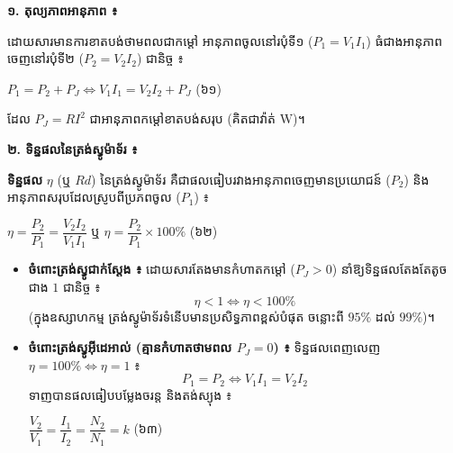 \vspace{0.5em}
\noindent
\textbf{១. តុល្យភាពអានុភាព ៖}

\noindent
ដោយសារមានការខាតបង់ថាមពលជាកម្ដៅ អានុភាពចូលនៅរបុំទី១ ($P_1 = V_1 I_1$) ធំជាងអានុភាពចេញនៅរបុំទី២ ($P_2 = V_2 I_2$) ជានិច្ច ៖
\begin{center}
    $\boxed{P_1 = P_2 + P_J} \iff \boxed{V_1 I_1 = V_2 I_2 + P_J}$ \quad (៦១)
\end{center}
ដែល $P_J = R I^2$ ជាអានុភាពកម្ដៅខាតបង់សរុប (គិតជាវ៉ាត់ $\text{W}$)។

\vspace{0.4em}
\noindent
\textbf{២. ទិន្នផលនៃត្រង់ស្វូម៉ាទ័រ ៖}

\noindent
\textbf{ទិន្នផល} $\eta$ (ឬ $Rd$) នៃត្រង់ស្វូម៉ាទ័រ គឺជាផលធៀបរវាងអានុភាពចេញមានប្រយោជន៍ ($P_2$) និងអានុភាពសរុបដែលស្រូបពីប្រភពចូល ($P_1$) ៖
\begin{center}
    $\boxed{\eta = \dfrac{P_2}{P_1} = \dfrac{V_2 I_2}{V_1 I_1}}$ \quad ឬ \quad $\boxed{\eta = \dfrac{P_2}{P_1} \times 100\%}$ \quad (៦២)
\end{center}

\begin{itemize}[itemsep=2.5pt, topsep=1.5pt, leftmargin=1.6em]
	\item \textbf{ចំពោះត្រង់ស្វូជាក់ស្ដែង ៖} ដោយសារតែងមានកំហាតកម្ដៅ ($P_J > 0$) នាំឱ្យទិន្នផលតែងតែតូចជាង $1$ ជានិច្ច ៖
    \[ \eta < 1 \iff \eta < 100\% \]
    (ក្នុងឧស្សាហកម្ម ត្រង់ស្វូម៉ាទ័រទំនើបមានប្រសិទ្ធភាពខ្ពស់បំផុត ចន្លោះពី $95\%$ ដល់ $99\%$)។

    \item \textbf{ចំពោះត្រង់ស្វូអុីដេអាល់ (គ្មានកំហាតថាមពល $P_J = 0$) ៖} ទិន្នផលពេញលេញ $\eta = 100\% \iff \eta = 1$ ៖
    \[ P_1 = P_2 \iff V_1 I_1 = V_2 I_2 \]
    ទាញបានផលធៀបបម្លែងចរន្ត និងតង់ស្យុង ៖
    \begin{center}
        $\boxed{\dfrac{V_2}{V_1} = \dfrac{I_1}{I_2} = \dfrac{N_2}{N_1} = k}$ \quad (៦៣)
    \end{center}
\end{itemize}

